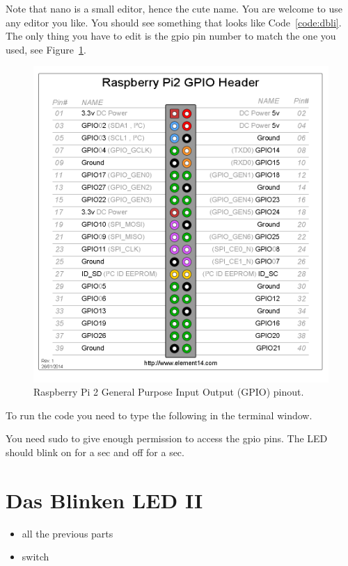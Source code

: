 Note that nano is a small editor, hence the cute name.  You are welcome to use any editor you like.  You should see something that looks like Code~\ref{code:dbli}.  The only thing you have to edit is the gpio pin number to match the one you used, see Figure~\ref{fig:RPiGPIO}.

\begin{figure}\begin{center}
\caption{Raspberry Pi 2 General Purpose Input Output (GPIO) pinout.}\label{fig:RPiGPIO}
\includegraphics[width=.7\textwidth]{../images/GPIO_Pi2.png}
\end{center}\end{figure}


To run the code you need to type the following in the terminal window.


You need sudo to give enough permission to access the gpio pins.  The LED should blink on for a sec and off for a sec.

\section{Das Blinken LED II}

\begin{itemize}
  \item all the previous parts
  \item switch
\end{itemize}

